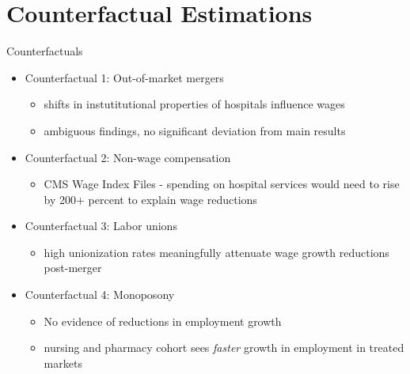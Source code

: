 \documentclass{beamer}
\begin{document}
\section{Counterfactual Estimations}
\begin{frame}{Counterfactuals}
  \begin{itemize}
    \item Counterfactual 1: Out-of-market mergers
    \begin{itemize}
      \item shifts in instutitutional properties of hospitals influence wages
      \item ambiguous findings, no significant deviation from main results
    \end{itemize}
    \item Counterfactual 2: Non-wage compensation
    \begin{itemize}
      \item CMS Wage Index Files - spending on hospital services would need to rise by 200+ percent to explain wage reductions
    \end{itemize}
    \item Counterfactual 3: Labor unions
    \begin{itemize}
      \item high unionization rates meaningfully attenuate wage growth reductions post-merger
    \end{itemize}
    \item Counterfactual 4: Monoposony
    \begin{itemize}
      \item No evidence of reductions in employment growth
      \item nursing and pharmacy cohort sees \textit{faster} growth in employment in treated markets
    \end{itemize}
  \end{itemize}
\end{frame}
\end{document}
